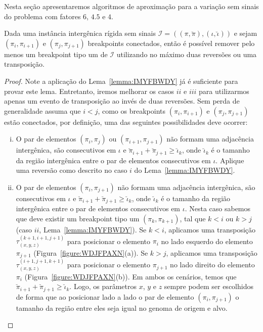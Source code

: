 Nesta seção apresentaremos algoritmos de aproximação para a variação sem sinais do problema \SbIRT{} com fatores $6$, $4.5$ e $4$.


\begin{lemma}\label{lemma:SIAFJFDO}
Dada uma instância intergênica rígida sem sinais $\mathcal{I}=((\pi,\breve\pi),(\iota,\breve\iota))$ e sejam $(\pi_i,\pi_{i+1})$ e $(\pi_j,\pi_{j+1})$ breakpoints conectados, então é possível remover pelo menos um breakpoint tipo um de $\mathcal{I}$ utilizando no máximo duas reversões ou uma transposição.
\end{lemma}
\begin{proof}
Note a aplicação do Lema~\ref{lemma:IMYFBWDY} já é suficiente para provar este lema. Entretanto, iremos melhorar os casos $ii$ e $iii$ para utilizarmos apenas um evento de transposição ao invés de duas reversões. Sem perda de generalidade assuma que $i < j$, como os breakpoints $(\pi_i,\pi_{i+1})$ e $(\pi_j,\pi_{j+1})$ estão conectados, por definição, uma das seguintes possibilidades deve ocorrer:
\begin{enumerate}[i.]
  \item O par de elementos $(\pi_i,\pi_{j})$ ou $(\pi_{i+1},\pi_{j+1})$ não formam uma adjacência intergênica, são consecutivos em $\iota$ e $\breve\pi_{i+1} + \breve\pi_{j+1} \ge \breve\iota_k$, onde $\breve\iota_k$ é o tamanho da região intergênica entre o par de elementos consecutivos em $\iota$. Aplique uma reversão como descrito no caso $i$ do Lema~\ref{lemma:IMYFBWDY}.
  \item O par  de elementos $(\pi_i,\pi_{j+1})$ não formam uma adjacência intergênica, são consecutivos em $\iota$ e $\breve\pi_{i+1} + \breve\pi_{j+1} \ge \breve\iota_k$, onde $\breve\iota_k$ é o tamanho da região intergênica entre o par de elementos consecutivos em $\iota$. Nesta caso sabemos que deve existir um breakpoint tipo um $(\pi_k, \pi_{k+1})$, tal que $k <i$ ou $k > j$ (caso $ii$, Lema~\ref{lemma:IMYFBWDY}). Se $k < i$, aplicamos uma transposição $\tau^{(k+1,i+1,j+1)}_{(x,y,z)}$ para posicionar o elemento $\pi_{i}$ no lado esquerdo do elemento $\pi_{j+1}$ (Figura~\ref{figure:WDJFPAXN}(a)). Se $k > j$, aplicamos uma transposição $\tau^{(i+1,j+1,k+1)}_{(x,y,z)}$ para posicionar o elemento $\pi_{j+1}$ no lado direito do elemento $\pi_{i}$ (Figura~\ref{figure:WDJFPAXN}(b)). Em ambos os cenários, temos que $\breve\pi_{i+1} + \breve\pi_{j+1} \ge \breve\iota_k$. Logo, os parâmetros $x$, $y$ e $z$ sempre podem ser escolhidos de forma que ao posicionar lado a lado o par de elemento $(\pi_i,\pi_{j+1})$ o tamanho da região entre eles seja igual no genoma de origem e alvo.

\end{enumerate}
\end{proof}
